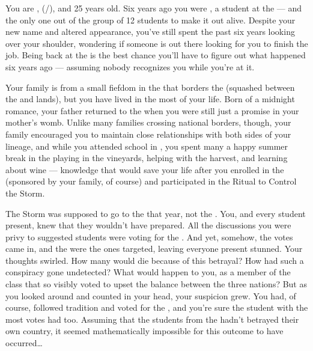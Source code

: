\documentclass[char]{GL2020}
\begin{document}
\name{\cAssistantScientist{}}

You are \cAssistantScientist{\intro}, (\cAssistantScientist{\they}/\cAssistantScientist{\them}), and 25 years old. Six years ago you were \textbf{\cKidScientist{\intro}}, a student at the \pSchool{} — and the only one out of the group of 12 students to make it out alive. Despite your new name and altered appearance, you've still spent the past six years looking over your shoulder, wondering if someone is out there looking for you to finish the job. Being back at the \pSc{} is the best chance you'll have to figure out what happened six years ago — assuming nobody recognizes you while you're at it.

Your family is from a small fiefdom in the \pFarm{} that borders the \pTech{} (squashed between the \cWildCard{\formal} and \cChupStudent{\formal} lands), but you have lived in the \pTech{} most of your life. Born of a midnight romance, your father returned to the \pTech{} when you were still just a promise in your mother's womb. Unlike many families crossing national borders, though, your family encouraged you to maintain close relationships with both sides of your lineage, and while you attended school in \pTech{}, you spent many a happy summer break in the \pFarm{} playing in the vineyards, helping with the harvest, and learning about wine — knowledge that would save your life after you enrolled in the \pSc{} (sponsored by your \pFarm{} family, of course) and participated in the Ritual to Control the Storm.

The Storm was supposed to go to the \pTech{} that year, not the \pShip{}. You, and every student present, knew that they wouldn't have prepared. All the discussions you were privy to suggested students were voting for the \pTech{}. And yet, somehow, the votes came in, and the \pShip{} were the ones targeted, leaving everyone present stunned. Your thoughts swirled. How many would die because of this betrayal? How had such a conspiracy gone undetected? What would happen to you, as a member of the class that so visibly voted to upset the balance between the three nations? But as you looked around and counted in your head, your suspicion grew. You had, of course, followed tradition and voted for the \pTech{}, and you're sure the \pFarm{} student with the most votes had too. Assuming that the students from the \pShip{} hadn't betrayed their own country, it seemed mathematically impossible for this outcome to have occurred\ldots{}
\end{document}

